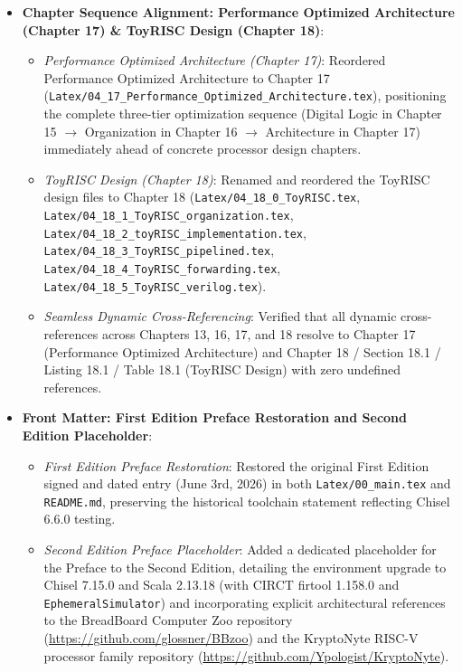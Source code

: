 \begin{itemize}
\begin{itemize}
    \end{itemize}
    \item \textbf{Chapter Sequence Alignment: Performance Optimized Architecture (Chapter 17) \& ToyRISC Design (Chapter 18)}:
    \begin{itemize}
        \item \textit{Performance Optimized Architecture (Chapter 17)}: Reordered Performance Optimized Architecture to Chapter 17 (\texttt{Latex/04\_17\_Performance\_Optimized\_Architecture.tex}), positioning the complete three-tier optimization sequence (Digital Logic in Chapter 15 $\rightarrow$ Organization in Chapter 16 $\rightarrow$ Architecture in Chapter 17) immediately ahead of concrete processor design chapters.
        \item \textit{ToyRISC Design (Chapter 18)}: Renamed and reordered the ToyRISC design files to Chapter 18 (\texttt{Latex/04\_18\_0\_ToyRISC.tex}, \texttt{Latex/04\_18\_1\_ToyRISC\_organization.tex}, \texttt{Latex/04\_18\_2\_toyRISC\_implementation.tex}, \texttt{Latex/04\_18\_3\_ToyRISC\_pipelined.tex}, \texttt{Latex/04\_18\_4\_ToyRISC\_forwarding.tex}, \texttt{Latex/04\_18\_5\_ToyRISC\_verilog.tex}).
        \item \textit{Seamless Dynamic Cross-Referencing}: Verified that all dynamic cross-references across Chapters 13, 16, 17, and 18 resolve to Chapter 17 (Performance Optimized Architecture) and Chapter 18 / Section 18.1 / Listing 18.1 / Table 18.1 (ToyRISC Design) with zero undefined references.
    \end{itemize}
    \item \textbf{Front Matter: First Edition Preface Restoration and Second Edition Placeholder}:
    \begin{itemize}
        \item \textit{First Edition Preface Restoration}: Restored the original First Edition signed and dated entry (June 3rd, 2026) in both \texttt{Latex/00\_main.tex} and \texttt{README.md}, preserving the historical toolchain statement reflecting Chisel 6.6.0 testing.
        \item \textit{Second Edition Preface Placeholder}: Added a dedicated placeholder for the Preface to the Second Edition, detailing the environment upgrade to Chisel 7.15.0 and Scala 2.13.18 (with CIRCT firtool 1.158.0 and \texttt{EphemeralSimulator}) and incorporating explicit architectural references to the BreadBoard Computer Zoo repository (\url{https://github.com/glossner/BBzoo}) and the KryptoNyte RISC-V processor family repository (\url{https://github.com/Ypologist/KryptoNyte}).

\end{itemize}
\end{itemize}
